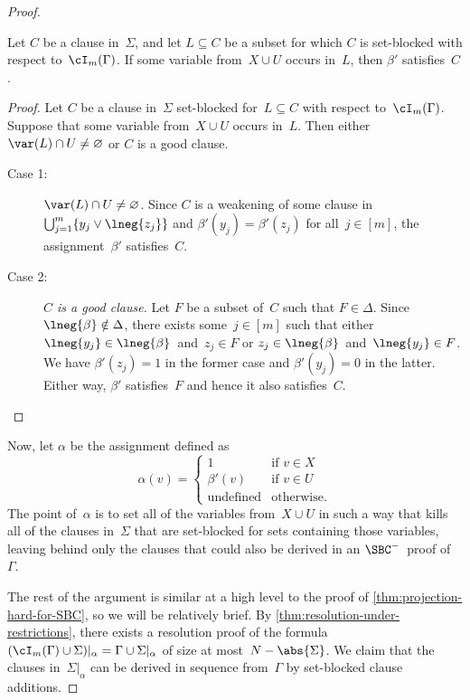 \documentclass[10pt,a4paper]{article}
\begin{document}
\begin{proof}
  \begin{claim}\label{thm:beta'-satisfies-XU-SBCs}
    Let $C$ be a clause in~$\Sigma$,
    and let $L \subseteq C$ be a subset
    for which $C$ is set-blocked with respect to~$\cI_m(\Gamma)$.
    If some variable from~$X \cup U$ occurs in~$L$,
    then $\beta'$ satisfies~$C$.
  \end{claim}
  \begin{proof}
    Let $C$ be a clause in~$\Sigma$
    set-blocked for~$L \subseteq C$ with respect to~$\cI_m(\Gamma)$.
    Suppose that some variable from~$X \cup U$ occurs in~$L$.
    Then either $\var(L) \cap U \neq \varnothing$ or $C$ is a good clause.
    \begin{description}
    \item[Case 1:] $\var(L) \cap U \neq \varnothing$.
      Since $C$ is a weakening of some clause
      in~$\bigcup_{j = 1}^m \{y_j \lor \lneg{z_j}\}$
      and $\beta'(y_j) = \beta'(z_j)$ for all~$j \in [m]$,
      the assignment~$\beta'$ satisfies~$C$.
    \item[Case 2:] \textit{$C$ is a good clause.}
      Let $F$ be a subset of~$C$ such that $F \in \Delta$.
      Since $\lneg{\beta} \notin \Delta$,
      there exists some~$j \in [m]$ such that
      either $\lneg{y_j} \in \lneg{\beta}$~and~$z_j \in F$
      or $z_j \in \lneg{\beta}$~and~$\lneg{y_j} \in F$.
      We have $\beta'(z_j) = 1$ in the former case
      and $\beta'(y_j) = 0$ in the latter.
      Either way, $\beta'$ satisfies~$F$ and hence it also satisfies~$C$. \qedhere
    \end{description}
  \end{proof}

  Now, let $\alpha$ be the assignment defined as
  \begin{equation*}
    \alpha(v) =
    \begin{cases}
      1 & \text{if } v \in X \\
      \beta'(v) & \text{if } v \in U \\
      \text{undefined} & \text{otherwise}.
    \end{cases}
  \end{equation*}
  The point of~$\alpha$ is to set all of the variables from~$X \cup U$
  in such a way that kills all of the clauses in~$\Sigma$
  that are set-blocked for sets containing those variables,
  leaving behind only the clauses that could
  also be derived in an $\SBC^-$~proof of~$\Gamma$.

  The rest of the argument is similar at a high level
  to the proof of \cref{thm:projection-hard-for-SBC}, so we will be relatively brief.
  By \cref{thm:resolution-under-restrictions}, there exists a resolution proof
  of the formula~$(\cI_m(\Gamma) \cup \Sigma)|_\alpha = \Gamma \cup \Sigma|_\alpha$
  of size at most~$N - \abs{\Sigma}$.
  We claim that the clauses in~$\Sigma|_\alpha$ can be derived
  in sequence from~$\Gamma$ by set-blocked clause additions.


\end{proof}
\end{document}
